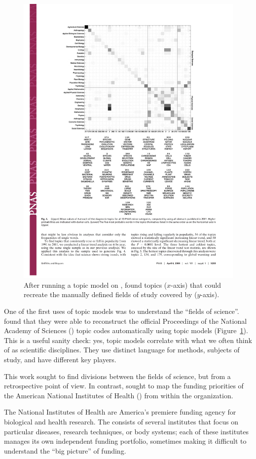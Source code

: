 \begin{figure}
  \includegraphics[width=.8\linewidth]{figures/sci_gs}
  \caption{After running a topic model on ,
    \citet{griffiths-04} found topics ($x$-axis) that could recreate
    the manually defined fields of study covered by 
    ($y$-axis).}
\label{fig:pnas}
\end{figure}

One of the first uses of topic models was to understand the ``fields
of science''.  \citet{griffiths-04} found that they were able to
reconstruct the official Proceedings of the National Academy of Sciences () topic codes automatically using
topic models (Figure~\ref{fig:pnas}).  This is a useful sanity check:
yes, topic models correlate with what we often think of as scientific
disciplines.  They use distinct language for methods, subjects of
study, and have different key players.

This work sought to find divisions between the fields of science, but from a retrospective point of view.
In contrast, \citet{talley-11} sought to map the funding priorities of the American National Institutes
of Health () from within the organization.

The National Institutes of Health are America's premiere funding
agency for biological and health research.  The  consists of
several institutes that focus on particular diseases, research techniques, or body
systems; each of these institutes manages its own independent funding portfolio,
sometimes making it difficult to understand the ``big picture'' of funding.

